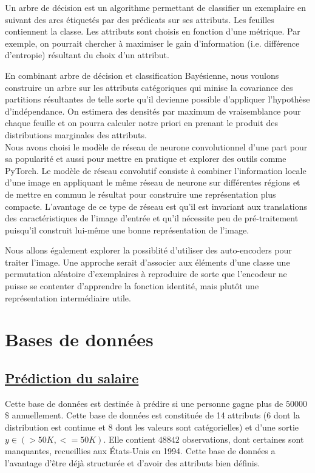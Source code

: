 \documentclass[12pt,letterpaper]{article}
\begin{document}
Un arbre de décision est un algorithme permettant de classifier un exemplaire
en suivant des arcs étiquetés par des prédicats sur ses attributs. Les feuilles
contiennent la classe. Les attributs sont choisis en fonction d'une métrique.
Par exemple, on pourrait chercher à maximiser le gain d'information (i.e.
différence d'entropie) résultant du choix d'un attribut.

En combinant arbre de décision et classification Bayésienne, nous voulons
construire un arbre sur les attributs catégoriques qui minise la covariance des
partitions résultantes de telle sorte qu'il devienne possible d'appliquer
l'hypothèse d'indépendance. On estimera des densités par maximum de
vraisemblance pour chaque feuille et on pourra calculer notre priori en prenant
le produit des distributions marginales des attributs.  \\

Nous avons choisi le modèle de réseau de neurone convolutionnel d'une part pour
sa popularité et aussi pour mettre en pratique et explorer des outils comme
PyTorch. Le modèle de réseau convolutif consiste à combiner l'information
locale d'une image en appliquant le même réseau de neurone sur différentes
régions et de mettre en commun le résultat pour construire une représentation
plus compacte.  L'avantage de ce type de réseau est qu'il est invariant aux
translations des caractéristiques de l'image d'entrée et qu'il nécessite peu de
pré-traitement puisqu'il construit lui-même une bonne représentation de
l'image.

Nous allons également explorer la possiblité d'utiliser des auto-encoders pour
traiter l'image. Une approche serait d'associer aux éléments d'une classe une
permutation aléatoire d'exemplaires à reproduire de sorte que l'encodeur ne
puisse se contenter d'apprendre la fonction identité, mais plutôt une
représentation intermédiaire utile.

\section{Bases de données}
\subsection{\href{http://archive.ics.uci.edu/ml/datasets/Adult}{Prédiction du salaire}}

Cette base de données est destinée à prédire si une personne gagne plus
de $50 000$\$ annuellement. Cette base de données est constituée de 14 attributs
(6 dont la distribution est continue et 8 dont les valeurs sont catégorielles)
et d'une sortie $y \in \left( >50K, <=50K \right)$. Elle contient $48 842$
observations, dont certaines sont manquantes, recueillies aux États-Unis en
1994. Cette base de données a l'avantage d'être déjà structurée et d'avoir des
attributs bien définis.
\end{document}
